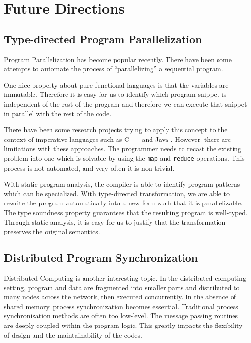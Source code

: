 \documentclass[12pt]{article}
\theoremstyle{plain} \numberwithin{equation}{section}
\theoremstyle{definition}
\begin{document}




\section{Future Directions}

\subsection{Type-directed Program Parallelization}
Program Parallelization has become popular recently. There have been 
some attempts to automate the process of ``parallelizing'' a
sequential program.

One nice property about pure functional languages is that
the variables are immutable. Therefore it is easy for us to identify
which program snippet is independent of the rest of the program
and therefore we can execute that snippet in parallel with the rest of
the code. 

There have been some research projects trying to apply this concept
to the context of imperative languages such as C++ \cite{mapreduce} 
and Java \cite{hadoop}. However, there are limitations with these
approaches. The programmer needs to recast the existing problem into 
one which is solvable by using the {\tt map} and {\tt reduce} operations.
This process is not automated, and very often it is non-trivial.

With static program analysis, the compiler
is able to identify program patterns which can be specialized.
With type-directed transformation, we are able to rewrite the program 
automatically into a new form such that it is parallelizable. The 
type soundness property guarantees that the resulting program is
well-typed. Through static analysis, it is easy for us to justify that the
transformation preserves the original semantics.


\subsection{Distributed Program Synchronization}
Distributed Computing is another interesting topic. In the distributed
computing setting, program and data are fragmented into smaller parts and 
distributed to many nodes across the network, then executed concurrently. 
In the absence of shared
memory, process synchronization becomes essential. Traditional process
synchronization methods are often too low-level. The message passing routines
are deeply coupled within the program logic. This greatly impacts 
the flexibility of design and the maintainability of the codes.
\end{document}

